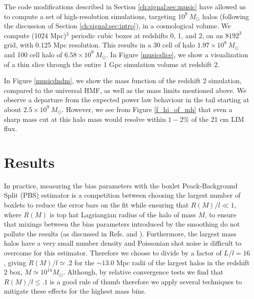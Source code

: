 The code modifications described in Section \ref{ch:signal:sec:music} have allowed us to compute a set of high-resolution simulations, targeting $10^9~M_\odot$ halos (following the discussion of Section \ref{ch:signal:sec:intro}), in a cosmological volume. We compute (1024 Mpc)$^3$ periodic cubic boxes at redshifts 0, 1, and 2, on an $8192^3$ grid, with 0.125 Mpc resolution. This results in a 30 cell of halo $1.97 \times 10^{9}~M_\odot$ and 100 cell halo of $6.58 \times 10^{9}~M_\odot$. In Figure \ref{musicslice}, we show a visualization of a thin slice through the entire 1 Gpc simulation volume at redshift 2. 

In Figure \ref{musicdndm}, we show the mass function of the redshift 2 simulation, compared to the \citeauthor{tinker2008} universal HMF, as well as the mass limits mentioned above. We observe a departure from the expected power law behaviour in the tail starting at about $2.5 \times 10^{9}~M_\odot$. However, we see from Figure \ref{f_hi_of_mh} that even a sharp mass cut at this halo mass would resolve within $1-2 \%$ of the 21 cm LIM flux.

\section{Results}
\label{ch:signal:sec:results}

In practice, measuring the bias parameters with the boxlet Peack-Background Split (PBS) estimator is a competition between choosing the largest number of boxlets to reduce the error bars on the fit while ensuring that $R(M)/l \ll 1$, where $R(M)$ is top hat Lagriangian radius of the halo of mass $M$, to ensure that mixings between the bias parameters introduced by the smoothing do not pollute the results (as discussed in Refs. \citep{biasreview} and \citep{modietal2017}). Furthermore, the largest mass halos  have a very small number density and Poissonian shot noise is difficult to overcome for this estimator. Therefore we choose to divide by a factor of $L/l = 16$, giving $R(M)/l \simeq .2$ for the $\sim 13.0$ Mpc radii of the largest halos in the redshift 2 box, $M \simeq 10^{14} M_\odot$. Although, by relative convergence tests we find that $R(M)/l \leq .1$ is a good rule of thumb therefore we apply several techniques to mitigate these effects for the highest mass bins.

